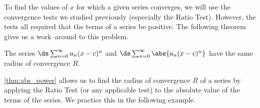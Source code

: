 To find the values of $x$ for which a given series converges, we will use the convergence tests we studied previously (especially the Ratio Test). However, the tests all required that the terms of a series be positive. The following theorem gives us a work--around to this problem.

{%
	The series $\ds \sum_{n=0}^\infty a_n(x-c)^n$ and $\ds \sum_{n=0}^\infty \abs{a_n(x-c)^n}$ have the same radius of convergence $R$.
}

\autoref{thm:abs_power} allows us to find the radius of convergence $R$ of a series by applying the Ratio Test (or any applicable test) to the absolute value of the terms of the series. We practice this in the following example.


\clearpage

